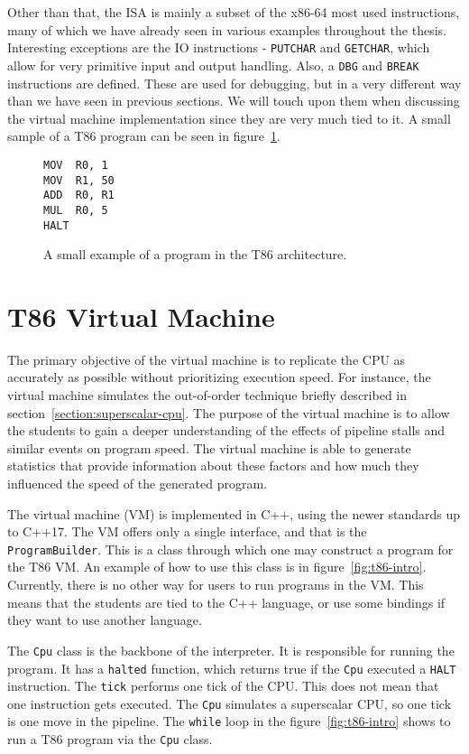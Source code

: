 Other than that, the ISA is mainly a subset of the x86-64 most used
instructions, many of which we have already seen in various examples throughout
the thesis. Interesting exceptions are the IO instructions - \texttt{PUTCHAR}
and \texttt{GETCHAR}, which allow for very primitive input and output handling.
Also, a \texttt{DBG} and \texttt{BREAK} instructions are defined. These are
used for debugging, but in a very different way than we have seen in previous
sections. We will touch upon them when discussing the virtual machine
implementation since they are very much tied to it. A small sample of a T86
program can be seen in figure~\ref{fig:t86-example}.

\begin{figure}
    \begin{lstlisting}
MOV  R0, 1
MOV  R1, 50
ADD  R0, R1
MUL  R0, 5
HALT
    \end{lstlisting}
    \caption{A small example of a program in the T86 architecture.}
    \label{fig:t86-example}
\end{figure}

\section{T86 Virtual Machine}\label{section:t86-vm}
The primary objective of the virtual machine is to replicate the CPU as
accurately as possible without prioritizing execution speed. For instance, the
virtual machine simulates the out-of-order technique briefly described in
section~\ref{section:superscalar-cpu}. The purpose of the virtual machine is to
allow the students to gain a deeper understanding of the effects of pipeline
stalls and similar events on program speed. The virtual machine is able to
generate statistics that provide information about these factors and how much
they influenced the speed of the generated program.

The virtual machine (VM) is implemented in C++, using the newer standards up to
C++17. The VM offers only a single interface, and that is the
\texttt{ProgramBuilder}. This is a class through which one may construct a
program for the T86 VM. An example of how to use this class is in
figure~\ref{fig:t86-intro}. Currently, there is no other way for users to run
programs in the VM. This means that the students are tied to the C++ language,
or use some bindings if they want to use another language.

The \texttt{Cpu} class is the backbone of the interpreter. It is responsible
for running the program. It has a \texttt{halted} function, which returns true
if the \texttt{Cpu} executed a \texttt{HALT} instruction. The \texttt{tick}
performs one tick of the CPU. This does not mean that one instruction gets
executed. The \texttt{Cpu} simulates a superscalar CPU, so one tick is one move
in the pipeline. The \texttt{while} loop in the figure~\ref{fig:t86-intro}
shows to run a T86 program via the \texttt{Cpu} class.

